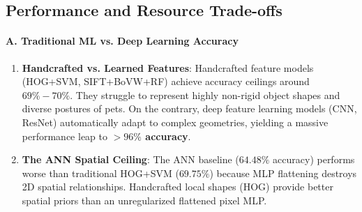 \documentclass[12pt,a4paper]{article}
\begin{document}
\begin{table}[H]
\centering
\caption{Comparative Benchmark of All Models}
\label{tab:comparison_all}
\end{table}

\subsection{Performance and Resource Trade-offs}

\paragraph{A. Traditional ML vs. Deep Learning Accuracy}
\begin{enumerate}
    \item \textbf{Handcrafted vs. Learned Features}: Handcrafted feature models (HOG+SVM, SIFT+BoVW+RF) achieve accuracy ceilings around $69\% - 70\%$. They struggle to represent highly non-rigid object shapes and diverse postures of pets. On the contrary, deep feature learning models (CNN, ResNet) automatically adapt to complex geometries, yielding a massive performance leap to \textbf{$>96\%$ accuracy}.
    \item \textbf{The ANN Spatial Ceiling}: The ANN baseline ($64.48\%$ accuracy) performs worse than traditional HOG+SVM ($69.75\%$) because MLP flattening destroys 2D spatial relationships. Handcrafted local shapes (HOG) provide better spatial priors than an unregularized flattened pixel MLP.
\end{enumerate}
\end{document}
